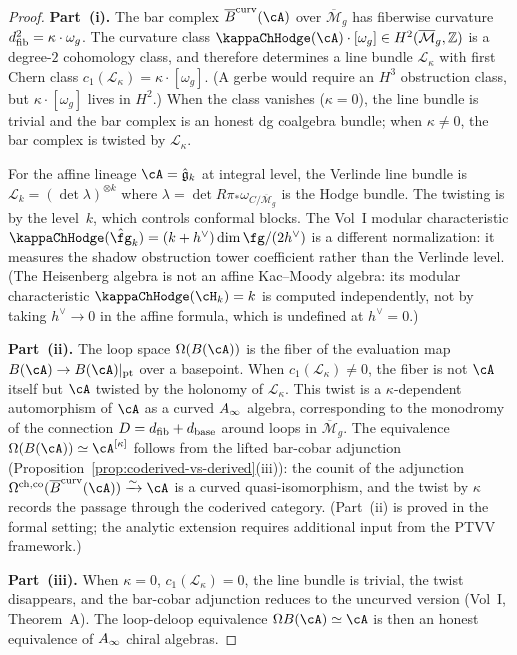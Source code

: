 \begin{proof}
\textbf{Part~(i).}
The bar complex $\barB^{\mathrm{curv}}(\cA)$ over
$\overline{\mathcal M}_g$ has fiberwise curvature
$d_{\mathrm{fib}}^2 = \kappa \cdot \omega_g$. The curvature class
$\kappaChHodge(\cA) \cdot [\omega_g] \in H^2(\overline{\mathcal M}_g,
\mathbb{Z})$ is a degree-$2$ cohomology class, and therefore
determines a line bundle $\mathcal{L}_\kappa$ with first Chern
class $c_1(\mathcal{L}_\kappa) = \kappa \cdot [\omega_g]$.
(A gerbe would require an $H^3$ obstruction class, but
$\kappa \cdot [\omega_g]$ lives in $H^2$.) When the class vanishes
($\kappa = 0$), the line bundle is trivial and the bar complex is
an honest dg coalgebra bundle; when $\kappa \neq 0$, the bar
complex is twisted by $\mathcal{L}_\kappa$.

For the affine lineage $\cA = \hat{\mathfrak{g}}_k$ at integral level,
the Verlinde line bundle is $\mathcal{L}_k = (\det \lambda)^{\otimes k}$
where $\lambda = \det R\pi_* \omega_{C/\overline{\mathcal M}_g}$ is the
Hodge bundle. The twisting is by the level~$k$, which controls conformal
blocks. The Vol~I modular characteristic
$\kappaChHodge(\hat{\fg}_k) = (k+h^\vee)\dim\fg/(2h^\vee)$ is a different
normalization: it measures the shadow obstruction tower coefficient
rather than the Verlinde level. (The Heisenberg algebra is not
an affine Kac--Moody algebra: its modular characteristic
$\kappaChHodge(\cH_k) = k$ is computed independently, not by taking
$h^\vee \to 0$ in the affine formula, which is undefined at
$h^\vee = 0$.)

\textbf{Part~(ii).}
The loop space $\Omega(B(\cA))$ is the fiber of the evaluation map
$B(\cA) \to B(\cA)|_{\mathrm{pt}}$ over a basepoint. When
$c_1(\mathcal{L}_\kappa) \neq 0$, the fiber is not $\cA$ itself
but $\cA$ twisted by the holonomy of $\mathcal{L}_\kappa$.
This twist is a $\kappa$-dependent automorphism of $\cA$ as a
curved $A_\infty$ algebra, corresponding to the monodromy of the
connection $D = d_{\mathrm{fib}} + d_{\mathrm{base}}$ around loops in
$\overline{\mathcal M}_g$. The equivalence
$\Omega(B(\cA)) \simeq \cA^{[\kappa]}$ follows from the lifted
bar-cobar adjunction
(Proposition~\ref{prop:coderived-vs-derived}(iii)): the counit of
the adjunction
$\Omega^{\mathrm{ch,co}}(\barB^{\mathrm{curv}}(\cA))
\xrightarrow{\sim} \cA$ is a curved quasi-isomorphism, and the
twist by $\kappa$ records the passage through the coderived
category. (Part~(ii) is proved in the formal setting; the
analytic extension requires additional input from the PTVV
framework.)

\textbf{Part~(iii).}
When $\kappa = 0$, $c_1(\mathcal{L}_\kappa) = 0$, the line bundle
is trivial, the twist disappears, and the bar-cobar adjunction
reduces to the uncurved version (Vol~I, Theorem~A). The
loop-deloop equivalence $\Omega B(\cA) \simeq \cA$ is then an
honest equivalence of $A_\infty$ chiral algebras.
\end{proof}

